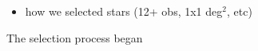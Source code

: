 \documentclass[aps,prb,twocolumn,superscriptaddress]{revtex4-1}
\begin{document}
\begin{itemize}
	\item{} how we selected stars (12+ obs, 1x1 deg$^2$, etc)
\end{itemize}

The selection process began


\end{document}
